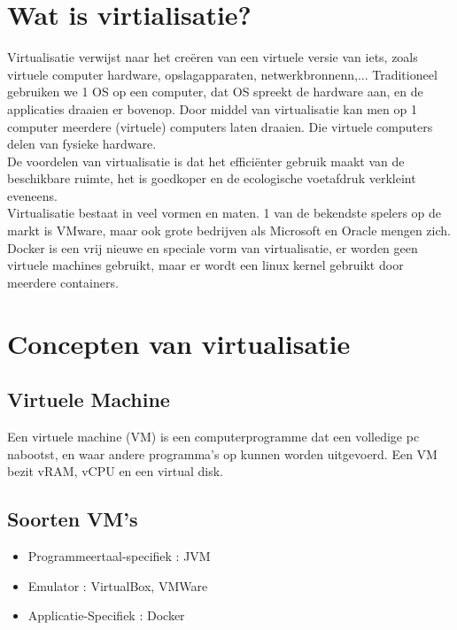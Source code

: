 \documentclass{report}
\begin{document}
   		\section{Wat is virtialisatie?}
   			Virtualisatie verwijst naar het creëren van een virtuele versie van iets, zoals virtuele computer hardware, opslagapparaten, netwerkbronnenn,... Traditioneel gebruiken we 1 OS op een computer, dat OS spreekt de hardware aan, en de applicaties draaien er bovenop. Door middel van virtualisatie kan men op 1 computer meerdere (virtuele) computers laten draaien. Die virtuele computers delen van fysieke hardware.
   			\\
   			De voordelen van virtualisatie is dat het efficiënter gebruik maakt van de beschikbare ruimte, het is goedkoper en de ecologische voetafdruk verkleint eveneens. 
   			\\
   			Virtualisatie bestaat in veel vormen en maten. 1 van de bekendste spelers op de markt is VMware, maar ook grote bedrijven als Microsoft en Oracle mengen zich. Docker is een vrij nieuwe en speciale vorm van virtualisatie, er worden geen virtuele machines gebruikt, maar er wordt een linux kernel gebruikt door meerdere containers.
   		\section{Concepten van virtualisatie}
   			\subsection{Virtuele Machine}
   				Een virtuele machine (VM) is een computerprogramme dat een volledige pc nabootst, en waar andere programma's op kunnen worden uitgevoerd. Een VM bezit vRAM, vCPU en een virtual disk.
   			\subsection{Soorten VM's}
   				\begin{itemize}
   					\item Programmeertaal-specifiek : JVM
   					\item Emulator : VirtualBox, VMWare
   					\item Applicatie-Specifiek : Docker
   				\end{itemize}
\end{document}
